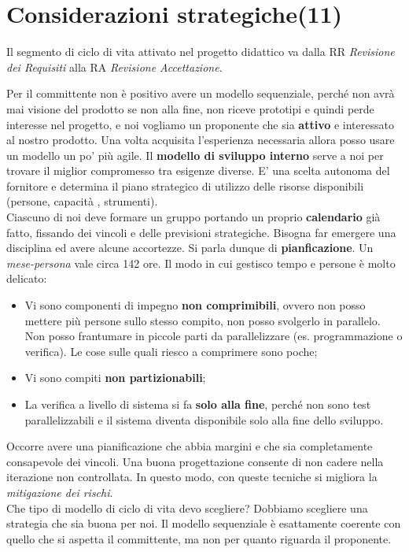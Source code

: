 



\section{Considerazioni strategiche(11)}

Il segmento di ciclo di vita attivato nel progetto didattico va dalla RR \textit{Revisione dei Requisiti} alla RA \textit{Revisione Accettazione}.

Per il committente non è positivo avere un modello sequenziale, perché non avrà  mai visione del prodotto se non alla fine, non riceve prototipi e quindi perde interesse nel progetto, e noi vogliamo un proponente che sia \textbf{attivo} e interessato al nostro prodotto. Una volta acquisita l'esperienza necessaria allora posso usare un modello un po' più agile. Il \textbf{modello di sviluppo interno} serve a noi per trovare il miglior compromesso tra esigenze diverse. E' una scelta autonoma del fornitore e determina il piano strategico di utilizzo delle risorse disponibili (persone, capacità , strumenti).\\

Ciascuno di noi deve formare un gruppo portando un proprio \textbf{calendario} già  fatto, fissando dei vincoli e delle previsioni strategiche. Bisogna far emergere una disciplina ed avere alcune accortezze. Si parla dunque di \textbf{pianficazione}. Un \textit{mese-persona} vale circa 142 ore. Il modo in cui gestisco tempo e persone è molto delicato:

\begin{itemize}

	\item Vi sono componenti di impegno \textbf{non comprimibili}, ovvero non posso mettere più persone sullo stesso compito, non posso svolgerlo in parallelo. Non posso frantumare in piccole parti da parallelizzare (es. programmazione o verifica). Le cose sulle quali riesco a comprimere sono poche;
	\item Vi sono compiti \textbf{non partizionabili};
	\item La verifica a livello di sistema si fa \textbf{solo alla fine}, perché non sono test parallelizzabili e il sistema diventa disponibile solo alla fine dello sviluppo.

\end{itemize}

Occorre avere una pianificazione che abbia margini e che sia completamente consapevole dei vincoli. Una buona progettazione consente di non cadere nella iterazione non controllata. In questo modo, con queste tecniche si migliora la \textit{mitigazione dei rischi}.\\
Che tipo di modello di ciclo di vita devo scegliere? Dobbiamo scegliere una strategia che sia buona per noi. Il modello sequenziale è esattamente coerente con quello che si aspetta il committente, ma non per quanto riguarda il proponente.

